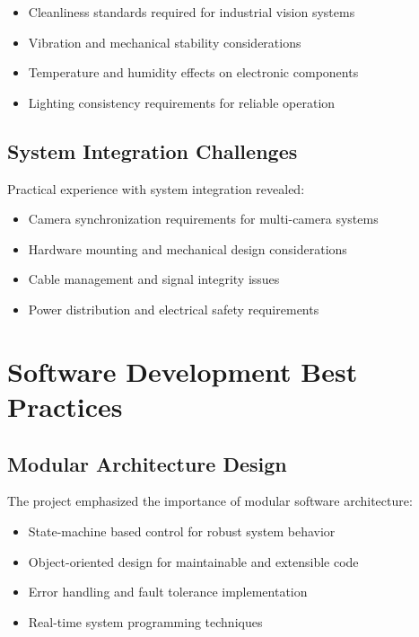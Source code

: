 \documentclass{book}
\begin{document}
\begin{itemize}
\item Cleanliness standards required for industrial vision systems
\item Vibration and mechanical stability considerations
\item Temperature and humidity effects on electronic components
\item Lighting consistency requirements for reliable operation
\end{itemize}

\subsection{System Integration Challenges}
\par\noindent Practical experience with system integration revealed:

\begin{itemize}
\item Camera synchronization requirements for multi-camera systems
\item Hardware mounting and mechanical design considerations
\item Cable management and signal integrity issues
\item Power distribution and electrical safety requirements
\end{itemize}

\section{Software Development Best Practices}

\subsection{Modular Architecture Design}
\par\noindent The project emphasized the importance of modular software architecture:

\begin{itemize}
\item State-machine based control for robust system behavior
\item Object-oriented design for maintainable and extensible code
\item Error handling and fault tolerance implementation
\item Real-time system programming techniques
\end{itemize}
\end{document}
